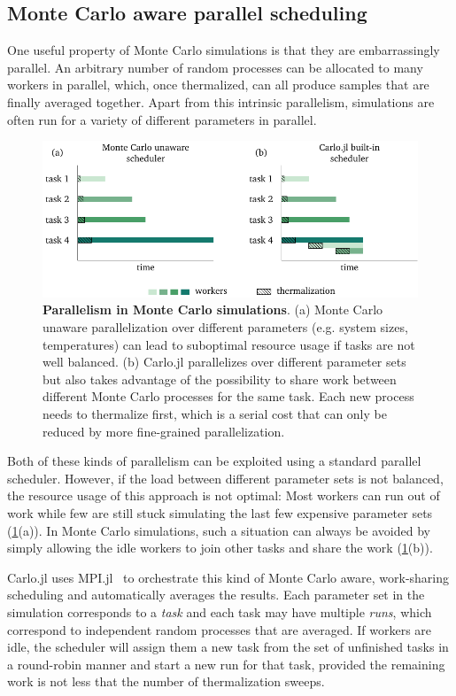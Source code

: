 \documentclass{SciPost}
\begin{document}
\subsection{Monte Carlo aware parallel scheduling}
One useful property of Monte Carlo simulations is that they are embarrassingly parallel. An arbitrary number of random processes can be allocated to many workers in parallel, which, once thermalized, can all produce samples that are finally averaged together. Apart from this intrinsic parallelism, simulations are often run for a variety of different parameters in parallel.
\begin{figure}
\includegraphics{figs/scheduling.pdf}
\caption{\textbf{Parallelism in Monte Carlo simulations}. (a) Monte Carlo unaware parallelization over different parameters (e.g. system sizes, temperatures) can lead to suboptimal resource usage if tasks are not well balanced. (b) Carlo.jl parallelizes over different parameter sets but also takes advantage of the possibility to share work between different Monte Carlo processes for the same task. Each new process needs to thermalize first, which is a serial cost that can only be reduced by more fine-grained parallelization.}
\label{fig:mcsched}
\end{figure}
Both of these kinds of parallelism can be exploited using a standard parallel scheduler. However, if the load between different parameter sets is not balanced, the resource usage of this approach is not optimal: Most workers can run out of work while few are still stuck simulating the last few expensive parameter sets (\cref{fig:mcsched}(a)). In Monte Carlo simulations, such a situation can always be avoided by simply allowing the idle workers to join other tasks and share the work (\cref{fig:mcsched}(b)).

Carlo.jl uses MPI.jl~\cite{Byrne2021} to orchestrate this kind of Monte Carlo aware, work-sharing scheduling and automatically averages the results. Each parameter set in the simulation corresponds to a \textit{task} and each task may have multiple \textit{runs}, which correspond to independent random processes that are averaged. If workers are idle, the scheduler will assign them a new task from the set of unfinished tasks in a round-robin manner and start a new run for that task, provided the remaining work is not less that the number of thermalization sweeps.
\end{document}
